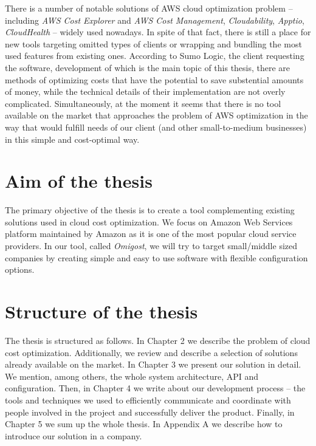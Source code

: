 \documentclass[licencjacka,en]{thesisclass}
\begin{document}
    There is a number of notable solutions of AWS cloud optimization
    problem -- including \textit{AWS Cost Explorer} and \textit{AWS Cost Management},
    \textit{Cloudability}, \textit{Apptio}, \textit{CloudHealth} -- widely used nowadays.
    In spite of that fact, there is still a place for new tools targeting
    omitted types of clients or wrapping and bundling the most used features from existing ones.
    According to Sumo Logic, the client requesting the software,
    development of which is the main topic of this thesis, there are methods of optimizing costs
    that have the potential to save substential amounts of money, while the technical details
    of their implementation are not overly complicated.
    Simultaneously, at the moment it seems that there is
    no tool available on the market that approaches the problem
    of AWS optimization in the way that would fulfill
    needs of our client (and other small-to-medium businesses)
    in this simple and cost-optimal way.

    \section{Aim of the thesis}

    The primary objective of the thesis is to create a tool
    complementing existing solutions used in cloud cost optimization.
    We focus on Amazon Web Services platform maintained by Amazon
    as it is one of the most popular cloud service providers.
    In our tool, called \textit{Omigost}, we will try to target small/middle
    sized companies by creating simple and easy to use software
    with flexible configuration options.

    \section{Structure of the thesis}

    The thesis is structured as follows.
    In Chapter 2 we describe the problem of cloud cost optimization.
    Additionally, we review and describe a selection of solutions already available
    on the market.
    In Chapter 3 we present our solution in detail.
    We mention, among others, the whole system architecture, API and configuration.
    Then, in Chapter 4 we write about our development process -- the tools and techniques
    we used to efficiently communicate and coordinate with people involved in the project
    and successfully deliver the product.
    Finally, in Chapter 5 we sum up the whole thesis.
    In Appendix A we describe how to introduce our solution in a company.
\end{document}
